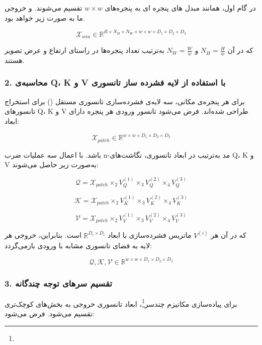 در گام اول، همانند مبدل های پنجره ای به پنجره‌های $w \times w$ تقسیم می‌شوند. و خروجی ما به صورت  زیر خواهد بود.

\[
\mathcal{X}_{win} \in \mathbb{R}^{B \times N_H \times N_W \times w \times w \times D_1 \times D_2 \times D_3}
\]

که در آن $N_H = \frac{H}{w}$ و $N_W = \frac{W}{w}$ به‌ترتیب تعداد پنجره‌ها در راستای ارتفاع و عرض تصویر هستند.

\subsubsection*{2. محاسبه‌ی Q، K و V با استفاده از لایه فشرده ساز تانسوری}

برای هر پنجره‌ی مکانی، سه لایه‌ی فشرده‌سازی تانسوری مستقل () برای استخراج تانسورهای Q، K و V طراحی شده‌اند. فرض می‌شود تانسور ورودی هر پنجره دارای ابعاد:

\[
\mathcal{X}_{patch} \in \mathbb{R}^{w \times w \times D_1 \times D_2 \times D_3}
\]

باشد. با اعمال سه عملیات ضرب n-مد به‌ترتیب در ابعاد تانسوری، نگاشت‌های Q، K و V به‌صورت زیر حاصل می‌شوند:

\begin{equation}
	\mathcal{Q} = \mathcal{X}_{patch} \times_2 V_Q^{(1)} \times_3 V_Q^{(2)} \times_4 V_Q^{(3)}
\end{equation}

\begin{equation}
	\mathcal{K} = \mathcal{X}_{patch} \times_2 V_K^{(1)} \times_3 V_K^{(2)} \times_4 V_K^{(3)}
\end{equation}

\begin{equation}
	\mathcal{V} = \mathcal{X}_{patch} \times_2 V_V^{(1)} \times_3 V_V^{(2)} \times_4 V_V^{(3)}
\end{equation}


که در آن هر $V^{(i)}$ ماتریس فشرده‌سازی با ابعاد $\mathbb{R}^{D_i \times D_i}$ است. بنابراین، خروجی هر لایه به فضای تانسوری مشابه با ورودی بازمی‌گردد:

\[
\mathcal{Q}, \mathcal{K}, \mathcal{V} \in \mathbb{R}^{w \times w \times D_1 \times D_2 \times D_3}
\]

\subsubsection*{3. تقسیم سرهای توجه چندگانه}

برای پیاده‌سازی مکانیزم چندسر\footnote{}، ابعاد تانسوری خروجی به بخش‌های کوچک‌تری تقسیم می‌شود. فرض می‌شود:

